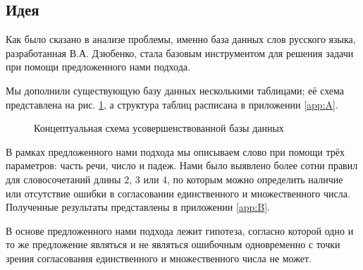 \documentclass[main]{subfiles}
\begin{document}
\subsection{Идея}

Как было сказано в анализе проблемы, именно база данных слов русского языка, разработанная В.А. Дзюбенко, стала базовым инструментом для решения задачи при помощи предложенного нами подхода.

Мы дополнили существующую базу данных несколькими таблицами; её схема представлена на рис. \ref{img1}, а структура таблиц расписана в приложении \ref{app:A}.


\begin{figure}[h]
	\begin{minipage}[h]{\linewidth}
			\captionsetup{format=hang,labelsep = endash}
		\caption{Концептуальная схема усовершенствованной базы данных}\label{img1}
	\end{minipage}
\end{figure}

В рамках предложенного нами подхода мы описываем слово при помощи трёх параметров: часть речи, число и падеж. Нами было выявлено более сотни правил для словосочетаний длины $2$, $3$ или $4$, по которым можно определить наличие или отсутствие ошибки в согласовании единственного и множественного числа. Полученные результаты представлены в приложении \ref{app:B}.

В основе предложенного нами подхода лежит гипотеза, согласно которой одно и то же предложение являться и не являться ошибочным одновременно с точки зрения согласования единственного и множественного числа не может. 
\end{document}
